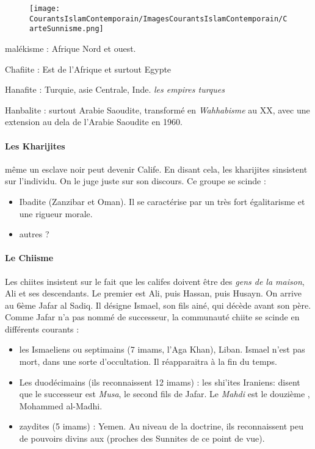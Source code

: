 \begin{figure}
    \centering
    \texttt{[image: CourantsIslamContemporain/ImagesCourantsIslamContemporain/CarteSunnisme.png]}
 
    \label{fig:my_label}
\end{figure}



\bi 
\item  malékisme : Afrique Nord et ouest.
\item Chafiite : Est de l'Afrique et surtout Egypte 
\item Hanafite : Turquie, asie Centrale, Inde. \textit{les empires turques}
\item Hanbalite : surtout Arabie Saoudite, transformé en \textit{Wahhabisme} au XX, avec une extension au dela de l'Arabie Saoudite en 1960.
\ei 

\paragraph{Les Kharijites} même un esclave noir peut devenir Calife. En disant cela, les kharijites sinsistent sur l'individu. On le juge juste sur son discours. 
Ce groupe se scinde : 
\begin{itemize}
\item Ibadite (Zanzibar et Oman). Il se caractérise par un très fort égalitarisme et une rigueur morale.
\item autres ? 
\end{itemize}

\paragraph{Le Chiisme} Les chiites insistent sur le fait que les califes doivent être des \textit{gens de la maison}, Ali et ses descendants. Le premier \imam est Ali, puis Hassan, puis Husayn. On arrive au 6ème \imam Jafar al Sadiq. Il désigne Ismael, son fils ainé, qui décède avant son père. Comme Jafar n'a pas nommé de successeur, la communauté chiite se scinde en différents courants : 
\begin{itemize}
\item les Ismaeliens ou septimains (7 imams, l'Aga Khan), Liban. Ismael n'est pas mort, dans une sorte d'occultation. Il réapparaitra à la fin du temps.  
\item Les duodécimains (ils reconnaissent 12 imams) : les shi'ites Iraniens: disent que le successeur est \textit{Musa}, le second fils de Jafar. Le \textit{Mahdi} est le douzième \imam, Mohammed al-Madhi.
\item zaydites (5 imams) : Yemen. Au niveau de la doctrine, ils reconnaissent peu de pouvoirs divins aux \imam  (proches des Sunnites de ce point de vue).
\end{itemize}


